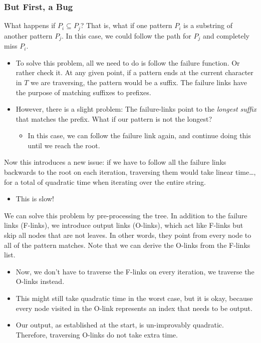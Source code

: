 \documentclass[10pt]{article}
\begin{document}
\subsubsection*{But First, a Bug}
What happens if $P_i \subseteq P_j$?  That is, what if one pattern $P_i$ is a substring of another pattern $P_j$.  In this case, we could follow the path for $P_j$ and completely miss $P_i$.
\begin{itemize}
	\item To solve this problem, all we need to do is follow the failure function.  Or rather check it.  At any given point, if a pattern ends at the current character in $T$ we are traversing, the pattern would be a suffix.  The failure links have the purpose of matching suffixes to prefixes.
	\item However, there is a slight problem: The failure-links point to the \textit{longest suffix} that matches the prefix.  What if our pattern is not the longest?
	\begin{itemize}
	    \item In this case, we can follow the failure link again, and continue doing this until we reach the root.
    \end{itemize}
\end{itemize}
Now this introduces a new issue: if we have to follow all the failure links backwards to the root on each iteration, traversing them would take linear time\dots, for a total of quadratic time when iterating over the entire string.  
\begin{itemize}
	\item This is slow!
\end{itemize}
We can solve this problem by pre-processing the tree.  In addition to the failure links (F-links), we introduce output links (O-links), which act like F-links but skip all nodes that are not leaves.  In other words, they point from every node to all of the pattern matches.  Note that we can derive the O-links from the F-links list.
\begin{itemize}
	\item Now, we don't have to traverse the F-links on every iteration, we traverse the O-links instead.
	\item This might still take quadratic time in the worst case, but it is okay, because every node visited in the O-link represents an index that needs to be output.
	\item Our output, as established at the start, is un-improvably quadratic.  Therefore, traversing O-links do not take extra time.
\end{itemize}
\end{document}
